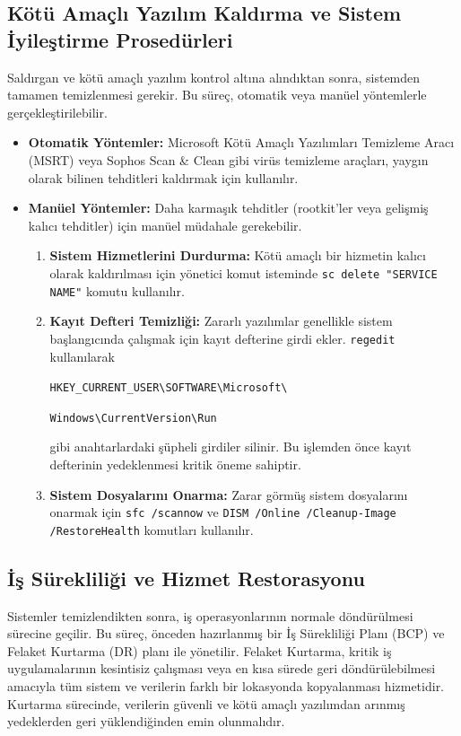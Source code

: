 \begin{itemize}
\subsection{Kötü Amaçlı Yazılım Kaldırma ve Sistem İyileştirme Prosedürleri}

Saldırgan ve kötü amaçlı yazılım kontrol altına alındıktan sonra, sistemden tamamen temizlenmesi gerekir. Bu süreç, otomatik veya manüel yöntemlerle gerçekleştirilebilir.

\begin{itemize}
    \item \textbf{Otomatik Yöntemler:} Microsoft Kötü Amaçlı Yazılımları Temizleme Aracı (MSRT) veya Sophos Scan \& Clean gibi virüs temizleme araçları, yaygın olarak bilinen tehditleri kaldırmak için kullanılır.
    \item \textbf{Manüel Yöntemler:} Daha karmaşık tehditler (rootkit'ler veya gelişmiş kalıcı tehditler) için manüel müdahale gerekebilir.
    \begin{enumerate}
        \item \textbf{Sistem Hizmetlerini Durdurma:} Kötü amaçlı bir hizmetin kalıcı olarak kaldırılması için yönetici komut isteminde \texttt{sc delete "SERVICE NAME"} komutu kullanılır.
        \item \textbf{Kayıt Defteri Temizliği:} Zararlı yazılımlar genellikle sistem başlangıcında çalışmak için kayıt defterine girdi ekler. \texttt{regedit} kullanılarak 
        
        \texttt{HKEY\_CURRENT\_USER\textbackslash{}SOFTWARE\textbackslash{}Microsoft\textbackslash{}}
        
        \texttt{Windows\textbackslash{}CurrentVersion\textbackslash{}Run} 
        
        gibi anahtarlardaki şüpheli girdiler silinir. Bu işlemden önce kayıt defterinin yedeklenmesi kritik öneme sahiptir.
        \item \textbf{Sistem Dosyalarını Onarma:} Zarar görmüş sistem dosyalarını onarmak için \texttt{sfc /scannow} ve \texttt{DISM /Online /Cleanup-Image /RestoreHealth} komutları kullanılır.
    \end{enumerate}
\end{itemize}

\subsection{İş Sürekliliği ve Hizmet Restorasyonu}

Sistemler temizlendikten sonra, iş operasyonlarının normale döndürülmesi sürecine geçilir. Bu süreç, önceden hazırlanmış bir İş Sürekliliği Planı (BCP) ve Felaket Kurtarma (DR) planı ile yönetilir. Felaket Kurtarma, kritik iş uygulamalarının kesintisiz çalışması veya en kısa sürede geri döndürülebilmesi amacıyla tüm sistem ve verilerin farklı bir lokasyonda kopyalanması hizmetidir. Kurtarma sürecinde, verilerin güvenli ve kötü amaçlı yazılımdan arınmış yedeklerden geri yüklendiğinden emin olunmalıdır.


\end{itemize}

